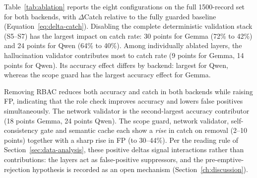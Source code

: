 Table~\ref{tab:ablation} reports the eight configurations on the full 1500-record
set for both backends, with $\Delta$Catch relative to the fully guarded
baseline (Equation~\ref{eq:delta-catch}). Disabling the complete deterministic
validation stack (S5--S7) has the largest impact on catch rate: 30 points for
Gemma (72\% to 42\%) and 24 points for Qwen (64\% to 40\%). Among individually
ablated layers, the hallucination validator contributes most to catch rate
(9 points for Gemma, 14 points for Qwen). Its accuracy effect differs by
backend: largest for Qwen, whereas the scope guard has the largest accuracy
effect for Gemma.

Removing RBAC reduces both accuracy and catch in both backends while raising
FP, indicating that the role check improves accuracy and lowers false positives
simultaneously. The network validator is the second-largest accuracy
contributor (18 points Gemma, 24 points Qwen). The scope guard, network
validator, self-consistency gate and semantic cache each show a
\emph{rise} in catch on removal (2--10 points) together with a sharp rise in FP
(to 30--44\%). Per the reading rule of Section~\ref{sec:data-analysis}, these
positive deltas signal interactions rather than contributions: the layers act
as false-positive suppressors, and the pre-emptive-rejection hypothesis is
recorded as an open mechanism (Section~\ref{ch:discussion}).

